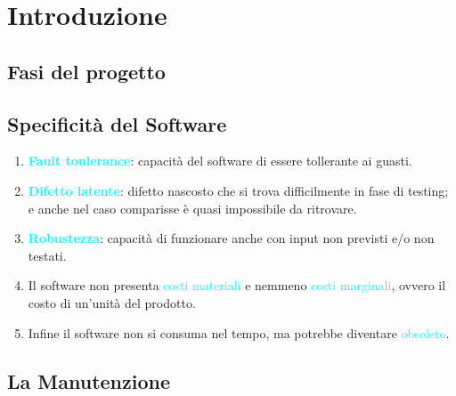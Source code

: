 \documentclass{article}
\begin{document}
    \begin{sloppypar}
    \section{Introduzione}
    \subsection*{Fasi del progetto}
    \begin{center}
    \end{center}
    \subsection*{Specificità del Software}
        \begin{enumerate}
            \item \textbf{\textcolor{cyan}{Fault toulerance}}: capacità del software di essere tollerante ai guasti.
            \item \textbf{\textcolor{cyan}{Difetto latente}}: difetto nascosto che si trova difficilmente in fase di testing; e anche nel caso comparisse è quasi impossibile da ritrovare.
            \item \textbf{\textcolor{cyan}{Robustezza}}: capacità di funzionare anche con input non previsti e/o non testati.
            \item Il software non presenta \textcolor{cyan}{costi materiali} e nemmeno \textcolor{cyan}{costi marginali}, ovvero il costo di un'unità del prodotto.
            \item Infine il software non si consuma nel tempo, ma potrebbe diventare \textcolor{cyan}{obsoleto}.
        \end{enumerate}
    \subsection*{La Manutenzione}

\end{sloppypar}
\end{document}
